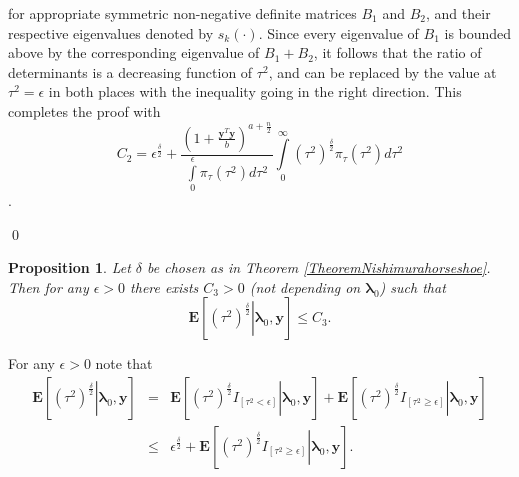 \documentclass[noinfoline,11pt]{imsart}
\numberwithin{equation}{section}
\theoremstyle{plain}
\newtheorem{prop}{Proposition}[section]
\newcommand{\y}{\mathbf{y}}
\newcommand{\bl}{\boldsymbol{\lambda}}
\newcommand{\E}{\boldsymbol{E}}
\begin{document}
\noindent
for appropriate symmetric non-negative definite matrices $B_1$ and $B_2$, and their 
respective eigenvalues denoted by $s_k (\cdot)$. Since every eigenvalue of $B_1$ is 
bounded above by the corresponding eigenvalue of $B_1 + B_2$, it follows that the 
ratio of determinants is a decreasing function of $\tau^2$, and can be replaced by 
the value at $\tau^2 = \epsilon$ in both places with the inequality going in the 
right direction. This completes the proof with 
$$
C_2=\epsilon^{\frac{\delta}{2}}+\frac{\left(1+\frac{\y^T\y}{b}\right)^{a+\frac{n}{2}}}{\int\limits_{0}^\epsilon\pi_\tau\left(\tau^2\right)d\tau^2}\int\limits_{0}^\infty\left(\tau^2\right)^{\frac{\delta}{2}}\pi_\tau\left(\tau^2\right)d\tau^2
$$. 

\noindent
\qed


\begin{prop}\label{Nishimuraupperboundontau^2}
Let $\delta$ be chosen as in Theorem \ref{TheoremNishimurahorseshoe}. Then 
for any $\epsilon>0$ there exists $C_3>0$ (not depending on $\bl_0$) such 
that  
$$
\E\left[\left.\left(\tau^2\right)^{\frac{\delta}{2}}\right|\bl_0,\y\right]
\leq C_3. 
$$
\end{prop}

\proof For any $\epsilon > 0$ note that 
\begin{eqnarray}\label{Nishimuraupperboundtau^2:1}
 \E\left[\left.\left(\tau^2\right)^{\frac{\delta}{2}}\right| \bl_0,\y\right]&=&\E\left[\left.\left(\tau^2\right)^{\frac{\delta}{2}}I_{\left[\tau^2<\epsilon\right]}\right| \bl_0,\y\right]+\E\left[\left.\left(\tau^2\right)^{\frac{\delta}{2}}I_{\left[\tau^2\geq\epsilon\right]}\right| \bl_0,\y\right]\nonumber \\
&\leq & \epsilon^{\frac{\delta}{2}}+\E\left[\left.\left(\tau^2\right)^{\frac{\delta}{2}}I_{\left[\tau^2\geq\epsilon\right]}\right| \bl_0,\y\right]. 
\end{eqnarray}
\end{document}
